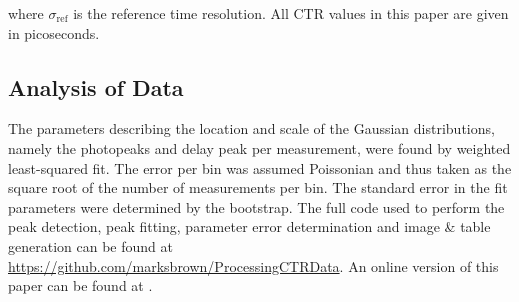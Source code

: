 where $\sigma_\text{ref}$ is the reference time resolution. All CTR values in this paper are given in picoseconds.

\subsection{Analysis of Data}
The parameters describing the location and scale of the Gaussian distributions, namely the photopeaks and delay peak per measurement, were found by weighted least-squared fit. The error per bin was assumed Poissonian and thus taken as the square root of the number of measurements per bin. The standard error in the fit parameters were determined by the bootstrap\cite{degroot2012probability}. The full code used to perform the peak detection, peak fitting, parameter error determination and image \& table generation can be found at \href{https://github.com/marksbrown/ProcessingCTRData}{https://github.com/marksbrown/ProcessingCTRData}. An online version of this paper can be found at \cite{Brown2014}.